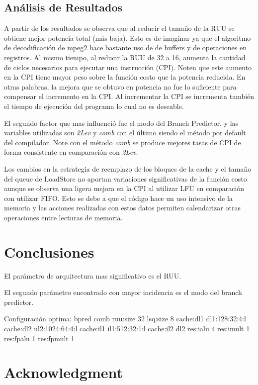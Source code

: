 \documentclass[journal]{IEEEtran}
\begin{document}
\subsection{An\'{a}lisis de Resultados}
A partir de los resultados se observa que al reducir el tama\~{n}o de la RUU se obtiene mejor potencia total (m\'{a}s baja). Esto es de imaginar ya que el algoritmo de decodificaci\'{o}n de mpeg2 hace bastante uso de de buffers y de operaciones en registros. Al mismo tiempo, al reducir la RUU de 32 a 16, aumenta la cantidad de ciclos necesarios para ejecutar una instrucci\'{o}n (CPI). Noten que este aumento en la CPI
tiene mayor peso sobre la funci\'{o}n costo que la potencia reducida. En otras palabras, la mejora que se obtuvo en potencia no fue lo suficiente para compensar el incremento en la CPI. Al incrementar la CPI se incrementa tambi\'{e}n
el tiempo de ejecuci\'{o}n del programa lo cual no es deseable.

El segundo factor que mas influenci\'{o} fue el modo del Branch Predictor, y las variables utilizadas son \textit{2Lev} y \textit{comb} con el \'{u}ltimo siendo el m\'{e}todo por default del compilador. Note con el m\'{e}todo \textit{comb} se produce
mejores tasas de CPI de forma consistente en comparaci\'{o}n con \textit{2Lev}.

Los cambios en la estrategia de reemplazo de los bloques de la cache y el tamaño del queue de LoadStore no aportan variaciones significativas de la funci\'{o}n costo aunque se observa una ligera mejora en la CPI al utilizar LFU en comparaci\'{o}n con utilizar FIFO. Esto se debe a que el c\'{o}digo hace un uso intensivo de la memoria y las acciones realizadas con estos datos permiten calendarizar otras operaciones entre lecturas de memoria.


\section{Conclusiones}
El par\'ametro de arquitectura mas significativo es el RUU.

El segundo par\'ametro encontrado con mayor incidencia es el modo del branch predictor.

Configuraci\'on optima:
bpred           comb
ruu:size        32
lsq:size        8
cache:dl1       dl1:128:32:4:l
cache:dl2       ul2:1024:64:4:l
cache:il1       il1:512:32:1:l
cache:il2       dl2
res:ialu        4
res:imult       1
res:fpalu       1
res:fpmult      1


\section*{Acknowledgment}
\end{document}
